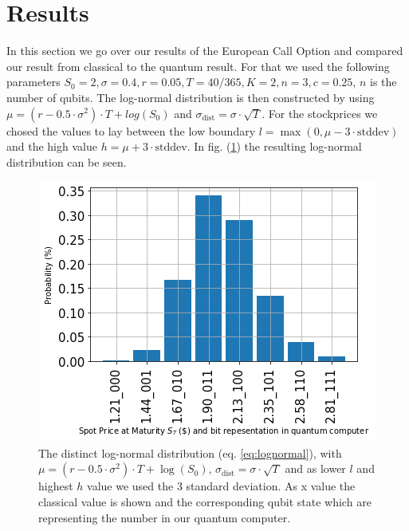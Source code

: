 \documentclass[../main.tex]{subfiles}
\begin{document}
\section{Results}\label{sec: results}
In this section we go over our results of the European Call Option and compared our result from classical to the quantum result.
For that we used the following parameters $S_0 = 2, \sigma = 0.4, r=0.05, T=40/365, K=2, n=3, c=0.25$, $n$ is the number of qubits.
The log-normal distribution is then constructed by using $\mu = (r-0.5 \cdot \sigma^2) \cdot T + log(S_0)$ and $\sigma_{\text{dist}} = \sigma \cdot \sqrt{T}$.
For the stockprices we chosed the values to lay between the low boundary $l = \max (0, \mu - 3 \cdot \text{stddev})$ and the high value $h = \mu + 3\cdot \text{stddev} $.
In fig. (\ref{fig:E_log-normal}) the resulting log-normal distribution can be seen.
\begin{figure}[H]
  \begin{center}
    \includegraphics[width=0.5\linewidth]{../../images/probability.png}
  \end{center}
  \caption{The distinct log-normal distribution (eq. \ref{eq:lognormal}), with $\mu=(r-0.5\cdot \sigma^2)\cdot T + \log(S_0)$, $\sigma_{\text{dist}}=\sigma \cdot \sqrt{T}$ and as lower $l$ and highest $h$ value we used the 3 standard deviation. As x value the classical value is shown and the corresponding qubit state which are representing the number in our quantum computer.}
  \label{fig:E_log-normal}
\end{figure}
\end{document}
